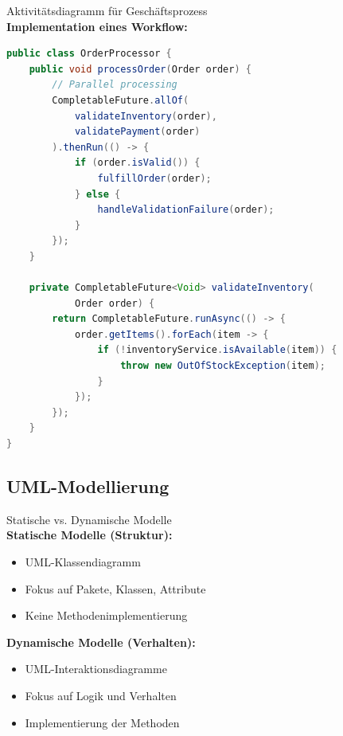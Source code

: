 \begin{example2}{Aktivitätsdiagramm für Geschäftsprozess}\\
\textbf{Implementation eines Workflow:}

\begin{lstlisting}[language=Java, style=basesmol]
public class OrderProcessor {
    public void processOrder(Order order) {
        // Parallel processing
        CompletableFuture.allOf(
            validateInventory(order),
            validatePayment(order)
        ).thenRun(() -> {
            if (order.isValid()) {
                fulfillOrder(order);
            } else {
                handleValidationFailure(order);
            }
        });
    }
    
    private CompletableFuture<Void> validateInventory(
            Order order) {
        return CompletableFuture.runAsync(() -> {
            order.getItems().forEach(item -> {
                if (!inventoryService.isAvailable(item)) {
                    throw new OutOfStockException(item);
                }
            });
        });
    }
}
\end{lstlisting}
\end{example2}

\subsection{UML-Modellierung}

\begin{KR}{Statische vs. Dynamische Modelle}\\
\textbf{Statische Modelle (Struktur):}
\begin{itemize}
    \item UML-Klassendiagramm
    \item Fokus auf Pakete, Klassen, Attribute
    \item Keine Methodenimplementierung
\end{itemize}

\textbf{Dynamische Modelle (Verhalten):}
\begin{itemize}
    \item UML-Interaktionsdiagramme
    \item Fokus auf Logik und Verhalten
    \item Implementierung der Methoden
\end{itemize}
\end{KR}

